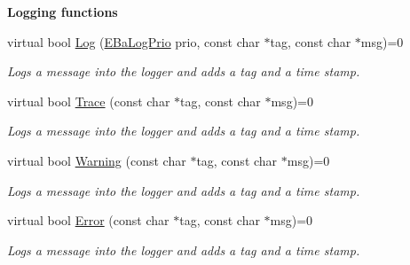 \begin{Indent}{\bf Logging functions}\par
\begin{DoxyCompactItemize}
\item 
virtual bool \hyperlink{classIBaLog_aa5af90c31d02caaf2ce598eb71f774ad}{Log} (\hyperlink{BaLog_8h_ab14f00a81932b8b62d2e8c4a2d7e3916}{E\+Ba\+Log\+Prio} prio, const char $\ast$tag, const char $\ast$msg)=0
\begin{DoxyCompactList}\small\item\em Logs a message into the logger and adds a {\ttfamily tag} and a time stamp. \end{DoxyCompactList}\item 
virtual bool \hyperlink{classIBaLog_a3daf158cda6813367b7324ef5171291b}{Trace} (const char $\ast$tag, const char $\ast$msg)=0
\begin{DoxyCompactList}\small\item\em Logs a message into the logger and adds a {\ttfamily tag} and a time stamp. \end{DoxyCompactList}\item 
virtual bool \hyperlink{classIBaLog_a47861c723ea82ba833d71a698a972bd0}{Warning} (const char $\ast$tag, const char $\ast$msg)=0
\begin{DoxyCompactList}\small\item\em Logs a message into the logger and adds a {\ttfamily tag} and a time stamp. \end{DoxyCompactList}\item 
virtual bool \hyperlink{classIBaLog_a58b60a1b38183c0eea84677cb0ab5853}{Error} (const char $\ast$tag, const char $\ast$msg)=0
\begin{DoxyCompactList}\small\item\em Logs a message into the logger and adds a {\ttfamily tag} and a time stamp. \end{DoxyCompactList}\end{DoxyCompactItemize}
\end{Indent}
